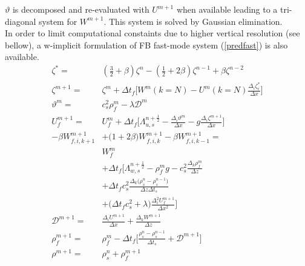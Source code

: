 \documentclass[a4paper]{article}
\numberwithin{equation}{section}
\begin{document}
 $\vartheta$ is decomposed and re-evaluated with $U^{m+1}$ when available leading to a tri-diagonal system for $W^{m+1}$. This system is solved by Gaussian elimination.\\ 
 In order to limit computational constaints due to higher vertical resolution (see bellow), a w-implicit formulation of FB fast-mode system (\ref{predfast}) is also available.
  \begin{equation}
  \label{predcorrwimp}
  \begin{split}
    \displaystyle
      \zeta^{*}=&(\frac{3}{2}+\beta)\zeta^{n}-(\frac{1}{2}+2\beta)\zeta^{n-1}
     +\beta\zeta^{n-2}\\[3mm]
     \zeta^{m+1}=&\zeta^{m}
     +\Delta{t}_{f}\big[W^{m}\scriptstyle(k=N)\textstyle
     -U^{m}\scriptstyle(k=N)\textstyle \frac{\Delta_i\zeta_{i}^{*}}{\Delta{x}}\big]\\[3mm]
     \vartheta^m =&c_s^2\rho_{f}^m-\lambda{\mathcal{D}}^m\\[3mm]
     U_{f}^{m+1}=&U_{f}^{m}
     +\Delta{t_{f}}\big[\Lambda_{u,s}^{n+\frac{1}{2}}
     -\frac{\Delta_i\vartheta^m}{\Delta x}
     -g\frac{\Delta_i\zeta^{m+1}}{\Delta x}\big]\\[3mm]
     -\beta W_{f,i,k+1}^{m+1}&
     +\big(1+2\beta\big)W_{f,i,k}^{m+1}
     -\beta W_{f,i,k-1}^{m+1} = \\[3mm]
     & W_{f}^m\\[3mm]
     & +\Delta t_f\big[\Lambda_{w,s}^{n+\frac{1}{2}}
     -\rho_{f}^m g-c_s^2\frac{\Delta_k\rho_{f}^m}{\Delta z}\\[3mm]
     &+\Delta t_f c_s^2\frac{\Delta_k
     \big(\rho_{s}^{n}-\rho_{s}^{n-1}\big)}{\Delta z\Delta{t_{s}}}\\[3mm]
     &+\big(\Delta t_f c_s^2+\lambda\big)
     \frac{\Delta_i^2 U_{f}^{m+1}}{\Delta x^2}
     \big]\\[3mm]
     \mathcal{D}^{m+1} =&\frac{\Delta_i U^{m+1}}{\Delta{x}}
     +\frac{\Delta_k W^{m+1}}{\Delta{z}}\\[3mm]
      \rho_{f}^{m+1} =& \rho_{f}^{m}
     -\Delta{t_{f}}\big[\frac{\rho_{s}^{n}-\rho_{s}^{n-1}}{\Delta{t_{s}}}
     +\mathcal{D}^{m+1}\big]\\[3mm]
     \rho^{m+1}=&\rho_{s}^{n}+\rho_{f}^{m+1}
  \end{split}
  \end{equation}
\end{document}
